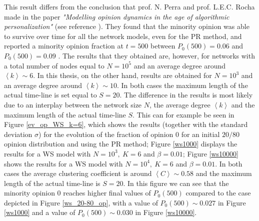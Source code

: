 \documentclass[11 pt , letterpaper , twoside , openright]{book}
\begin{document}
This result differs from the conclusion that prof. N. Perra and prof. L.E.C. Rocha made in the paper \textit{"Modelling opinion dynamics in the age of algorithmic personalization"} (see reference \cite{Perra2019}). They found that the minority opinion was able to survive over time for all the network models, even for the PR method, and reported a minority opinion fraction at $t=500$ between $P_0(500) = 0.06$ and $P_0(500) = 0.09$ \cite{Perra2019}. The results that they obtained are, however, for networks with a total number of nodes equal to $N = 10^5$ and an average degree around $\left<k\right> \sim 6$. In this thesis, on the other hand, results are obtained for $N=10^3$ and an average degree around $\left<k\right> \sim 10$. In both cases the maximum length of the actual time-line is set equal to $S=20$. The difference in the results is most likely due to an interplay between the network size $N$, the average degree $\left<k\right>$ and the maximum length of the actual time-line $S$. This can for example be seen in Figure \ref{ev_op_WS_k=6}, which shows the results (together with the standard deviation $\sigma$) for the evolution of the fraction of opinion 0 for an initial $20/80$ opinion distribution and using the PR method; Figure \ref{ws1000} displays the results for a WS model with $N=10^3,\ K=6$ and $\beta=0.01$; Figure \ref{ws10000} shows the results for a WS model with $N=10^4,\ K=6$ and $\beta=0.01$. In both cases the average clustering coefficient is around $\left<C\right> \sim 0.58$ and the maximum length of the actual time-line is $S=20$. In this figure we can see that the minority opinion 0 reaches higher final values of $P_0(500)$ compared to the case depicted in Figure \ref{ws_20-80_op}, with a value of $P_0(500) \sim 0.027$ in Figure \ref{ws1000} and a value of $P_0(500) \sim 0.030$ in Figure \ref{ws10000}.
\end{document}
